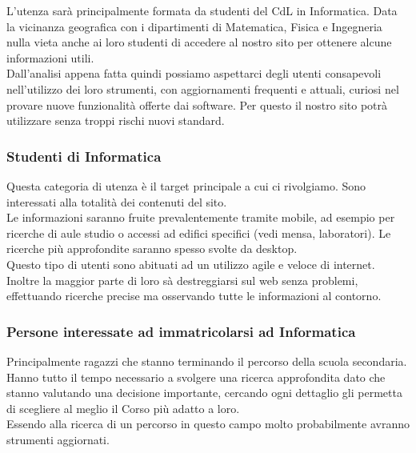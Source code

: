 L'utenza sarà principalmente formata da studenti del CdL in Informatica. Data la vicinanza geografica con i dipartimenti di Matematica, Fisica e Ingegneria nulla vieta anche ai loro studenti di accedere al nostro sito per ottenere alcune informazioni utili.\\
Dall'analisi appena fatta quindi possiamo aspettarci degli utenti consapevoli nell'utilizzo dei loro strumenti, con aggiornamenti frequenti e attuali, curiosi nel provare nuove funzionalità offerte dai software. Per questo il nostro sito potrà utilizzare senza troppi rischi nuovi standard.

\subsubsection{Studenti di Informatica}
Questa categoria di utenza è il target principale a cui ci rivolgiamo. Sono interessati alla totalità dei contenuti del sito. \\
Le informazioni saranno fruite prevalentemente tramite mobile, ad esempio per ricerche di aule studio o accessi ad edifici specifici (vedi mensa, laboratori). Le ricerche più approfondite saranno spesso svolte da desktop.\\
Questo tipo di utenti sono abituati ad un utilizzo agile e veloce di internet. Inoltre la maggior parte di loro sà destreggiarsi sul web senza problemi, effettuando ricerche precise ma osservando tutte le informazioni al contorno.

\subsubsection{Persone interessate ad immatricolarsi ad Informatica}
Principalmente ragazzi che stanno terminando il percorso della scuola secondaria. Hanno tutto il tempo necessario a svolgere una ricerca approfondita dato che stanno valutando una decisione importante, cercando ogni dettaglio gli permetta di scegliere al meglio il Corso più adatto a loro.\\
Essendo alla ricerca di un percorso in questo campo molto probabilmente avranno strumenti aggiornati.


